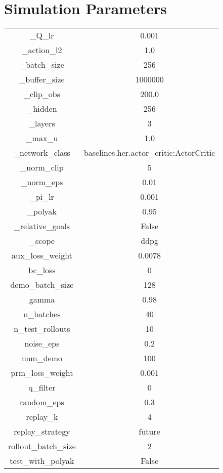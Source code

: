 \chapter{Simulation Parameters}


\label{chapter:appendixA}

\begin{center}
	\begin{tabular}{| c | c |}
		\hline
		\_Q\_lr & 0.001 \\
		\_action\_l2 & 1.0 \\
		\_batch\_size & 256 \\
		\_buffer\_size & 1000000 \\
		\_clip\_obs & 200.0 \\
		\_hidden & 256 \\
		\_layers & 3 \\
		\_max\_u & 1.0 \\
		\_network\_class & baselines.her.actor\_critic:ActorCritic \\
		\_norm\_clip & 5 \\
		\_norm\_eps & 0.01 \\
		\_pi\_lr & 0.001 \\
		\_polyak & 0.95 \\
		\_relative\_goals & False \\
		\_scope & ddpg \\
		aux\_loss\_weight & 0.0078 \\
		bc\_loss & 0 \\
		demo\_batch\_size & 128 \\
		gamma & 0.98 \\
		n\_batches & 40 \\
		n\_test\_rollouts & 10 \\
		noise\_eps & 0.2 \\
		num\_demo & 100 \\
		prm\_loss\_weight & 0.001 \\
		q\_filter & 0 \\
		random\_eps & 0.3 \\
		replay\_k & 4 \\
		replay\_strategy & future \\
		rollout\_batch\_size & 2 \\
		test\_with\_polyak & False \\
		\hline
	\end{tabular}
\end{center}



